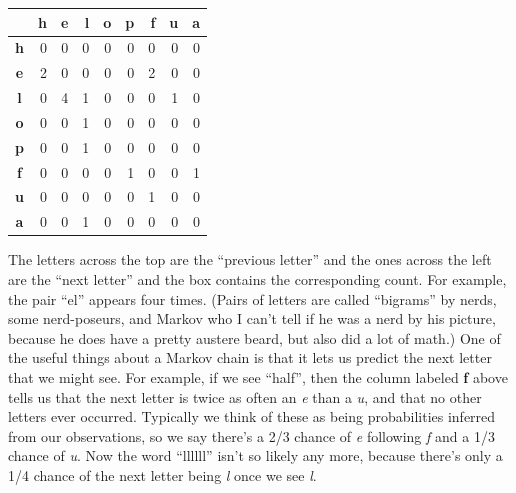 \documentclass[twocolumn]{article}
\begin{document}

\vspace{0.2in}
\begin{centering}
\begin{tabular}{|c|r|r|r|r|r|r|r|r|} %
\hline
\,  &  {\bf h}   & {\bf e}   & {\bf l}   & {\bf o}   & {\bf p}   & {\bf f}   & {\bf u}   & {\bf a} \\
\hline  %
{\bf h}   &  0   & 0   & 0   & 0   & 0   & 0   & 0   & 0    \\
\hline
{\bf e}   &  2   & 0   & 0   & 0   & 0   & 2   & 0   & 0    \\
\hline
{\bf l}   &  0   & 4   & 1   & 0   & 0   & 0   & 1   & 0    \\
\hline
{\bf o}   &  0   & 0   & 1   & 0   & 0   & 0   & 0   & 0    \\
\hline
{\bf p}   &  0   & 0   & 1   & 0   & 0   & 0   & 0   & 0    \\
\hline
{\bf f}   &  0   & 0   & 0   & 0   & 1   & 0   & 0   & 1    \\
\hline
{\bf u}   &  0   & 0   & 0   & 0   & 0   & 1   & 0   & 0    \\
\hline
{\bf a}   &  0   & 0   & 1   & 0   & 0   & 0   & 0   & 0    \\
\hline
\end{tabular}
\end{centering}
\vspace{0.2in}

The letters across the top are the ``previous letter'' and the ones
across the left are the ``next letter'' and the box contains the
corresponding count. For example, the pair ``el'' appears four times.
(Pairs of letters are called ``bigrams'' by nerds, some nerd-poseurs,
and Markov who I can't tell if he was a nerd by his picture, because
he does have a pretty austere beard, but also did a lot of math.) One
of the useful things about a Markov chain is that it lets us predict
the next letter that we might see. For example, if we see ``half'',
then the column labeled {\bf f} above tells us that the next letter is
twice as often an {\it e} than a {\it u}, and that no other letters
ever occurred. Typically we think of these as being probabilities
inferred from our observations, so we say there's a 2/3 chance of {\it
e} following {\it f} and a 1/3 chance of {\it u}. Now the word ``llllll''
isn't so likely any more, because there's only a 1/4 chance of the
next letter being {\it l} once we see {\it l}.
\end{document}
